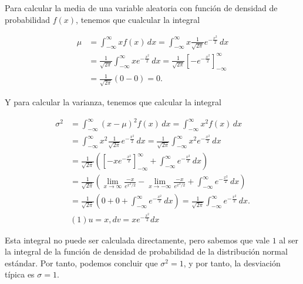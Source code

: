 \documentclass[
  spanish,
  a4paper,
]{scrreport}
\theoremstyle{definition}
\theoremstyle{remark}
\begin{document}
\begin{tcolorbox}[enhanced jigsaw, colbacktitle=quarto-callout-tip-color!10!white, opacityback=0, toptitle=1mm, title=\textcolor{quarto-callout-tip-color}{\faLightbulb}\hspace{0.5em}{Solución}, coltitle=black, opacitybacktitle=0.6, breakable, toprule=.15mm, leftrule=.75mm, titlerule=0mm, colframe=quarto-callout-tip-color-frame, left=2mm, bottomrule=.15mm, bottomtitle=1mm, arc=.35mm, rightrule=.15mm, colback=white]

Para calcular la media de una variable aleatoria con función de densidad
de probabilidad \(f(x)\), tenemos que cualcular la integral

\begin{align*}
\mu 
&= \int_{-\infty}^\infty x f(x)\,dx
= \int_{-\infty}^\infty x \frac{1}{\sqrt{2\pi}} e^{-\frac{x^2}{2}}\,dx\\
&= \frac{1}{\sqrt{2\pi}} \int_{-\infty}^\infty x e^{-\frac{x^2}{2}}\,dx
= \frac{1}{\sqrt{2\pi}} \left[ -e^{-\frac{x^2}{2}} \right]_{-\infty}^\infty \tag{Cambio $u=-x^2/2$}\\
&= \frac{1}{\sqrt{2\pi}} \left( 0 - 0 \right)
= 0.
\end{align*}

Y para calcular la varianza, tenemos que calcular la integral

\begin{align*}
\sigma^2
&= \int_{-\infty}^\infty (x - \mu)^2 f(x)\,dx
= \int_{-\infty}^\infty x^2 f(x)\,dx \tag{Como $\mu = 0$}\\
&= \int_{-\infty}^\infty x^2 \frac{1}{\sqrt{2\pi}} e^{-\frac{x^2}{2}}\,dx
= \frac{1}{\sqrt{2\pi}} \int_{-\infty}^\infty x^2 e^{-\frac{x^2}{2}}\,dx \\
&= \frac{1}{\sqrt{2\pi}} \left(\left[ -x e^{-\frac{x^2}{2}} \right]_{-\infty}^\infty + \int_{-\infty}^\infty e^{-\frac{x^2}{2}}\,dx\right) \tag{Integración por partes (1)}\\
&= \frac{1}{\sqrt{2\pi}} \left( \lim_{x\to\infty} \frac{-x}{e^{x^2/2}} - \lim_{x\to-\infty} \frac{-x}{e^{x^2/2}} + \int_{-\infty}^\infty e^{-\frac{x^2}{2}}\,dx \right) \\
&= \frac{1}{\sqrt{2\pi}} \left( 0 + 0 + \int_{-\infty}^\infty e^{-\frac{x^2}{2}}\,dx \right)
= \frac{1}{\sqrt{2\pi}} \int_{-\infty}^\infty e^{-\frac{x^2}{2}}\,dx.\\
&(1) u = x, dv = xe^{-\frac{x^2}{2}}dx
\end{align*}

Esta integral no puede ser calculada directamente, pero sabemos que vale
\(1\) al ser la integral de la función de densidad de probabilidad de la
distribución normal estándar. Por tanto, podemos concluir que
\(\sigma^2 = 1\), y por tanto, la desviación típica es \(\sigma = 1\).

\end{tcolorbox}
\end{document}
